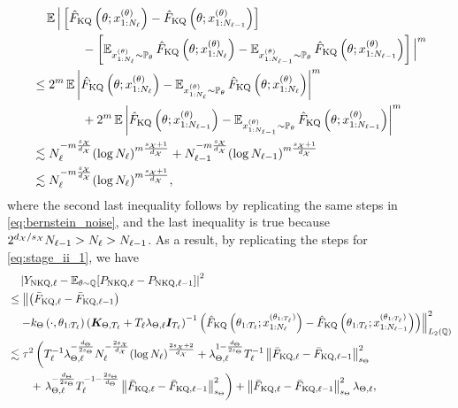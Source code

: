 \begin{align*}
    &\quad \operatorname{\mathbb{E}} \Big| \left[ \hat{F}_{\text{KQ}} \left(\theta; x_{1:N_\ell}^{(\theta)} \right) -  \hat{F}_{\text{KQ}}\left(\theta; x_{1:N_{\ell - 1} }^{ (\theta) } \right) \right] \\
    &\qquad\qquad - \left[ \operatorname{\mathbb{E}}_{x_{1:N_\ell}^{(\theta)} \sim \mathbb{P}_{\theta} } \hat{F}_{\text{KQ}} \left( \theta; x_{1:N_\ell}^{(\theta)} \right) - \operatorname{\mathbb{E}}_{x_{1:N_{ \ell - 1} }^{(\theta)} \sim \mathbb{P}_{\theta} } \hat{F}_{\text{KQ}} \left( \theta; x_{1:N_{\ell-1} }^{(\theta)} \right) \right] \Big|^m \\
    &\leq 2^m \operatorname{\mathbb{E}} \left| \hat{F}_{\text{KQ}} \left(\theta; x_{1:N_\ell}^{(\theta)} \right) 
    -  \operatorname{\mathbb{E}}_{x_{1:N_\ell}^{(\theta)} \sim \mathbb{P}_{\theta} } \hat{F}_{\text{KQ}} \left( \theta; x_{1:N_\ell}^{(\theta)} \right) \right|^m 
    \\
    &\qquad\qquad + 2^m \operatorname{\mathbb{E}} \left| \hat{F}_{\text{KQ}}\left(\theta; x_{1:N_{\ell - 1} }^{ (\theta) } \right) - \operatorname{\mathbb{E}}_{x_{1:N_{ \ell - 1} }^{(\theta)} \sim \mathbb{P}_{\theta} } \hat{F}_{\text{KQ}} \left( \theta; x_{1:N_{\ell-1} }^{(\theta)} \right) \right|^m \\
    &\lesssim N_\ell^{-m \frac{s_{\mathcal{X}}}{d_{\mathcal{X}}}} (\log N_\ell)^{m\frac{s_{\mathcal{X}}+1}{d_{\mathcal{X}}}} + N_{\ell-1}^{-m \frac{s_{\mathcal{X}}}{d_{\mathcal{X}}}} (\log N_{\ell-1})^{m\frac{s_{\mathcal{X}}+1}{d_{\mathcal{X}}}} \\
    &\lesssim N_\ell^{-m \frac{s_{\mathcal{X}}}{d_{\mathcal{X}}}} (\log N_\ell)^{m\frac{s_{\mathcal{X}}+1}{d_{\mathcal{X}}}},
\end{align*}
where the second last inequality follows by replicating the same steps in \eqref{eq:bernstein_noise}, and the last inequality is true because $2^{ d_{\mathcal{X}} / s_{\mathcal{X}}} N_{\ell-1} > N_\ell > N_{\ell - 1}$. 
As a result, by replicating the steps for \eqref{eq:stage_ii_1}, we have
\begin{align}\label{eq:Y_l_P_l}
    &\quad \left| Y_{\text{NKQ}, \ell} - \operatorname{\mathbb{E}}_{\theta \sim \mathbb{Q}}[P_{\text{NKQ}, \ell} - P_{\text{NKQ}, \ell-1}] \right|^2 \nonumber \\
    &\leq \left\| \left( \bar{F}_{\text{KQ}, \ell} - \bar{F}_{\text{KQ}, \ell-1} \right) \right. \nonumber \\
    &\quad \left. - k_{\Theta}\left(\cdot, \theta_{1: T_\ell} \right) \left(\boldsymbol{K}_{\Theta, T_\ell} + T_\ell \lambda_{\Theta, \ell} \boldsymbol{I}_{T_\ell} \right)^{-1} \left( \hat{F}_{\text{KQ}}\left(\theta_{1: T_\ell}; x_{1:N_\ell}^{(\theta_{1:T_\ell} )} \right) - \hat{F}_{\text{KQ}}\left(\theta_{1: T_\ell}; x_{1:N_{\ell - 1} }^{ (\theta_{1:T_\ell}) } \right) \right) \right\|_{L_2(\mathbb{Q})}^2 \nonumber \\
    & \lesssim \tau^2 \left( T_\ell^{-1} \lambda_{\Theta, \ell}^{ -\frac{d_\Theta}{2s_\Theta} } N_\ell^{-\frac{2s_{\mathcal{X}}}{d_{\mathcal{X}}}} (\log N_\ell)^{\frac{2s_{\mathcal{X}}+2}{d_{\mathcal{X}}}} + \lambda_{\Theta, \ell}^{1 - \frac{d_\Theta}{2s_\Theta}} T_\ell^{-1} \left\|\bar{F}_{\text{KQ}, \ell} - \bar{F}_{\text{KQ}, \ell-1} \right\|_{s_{\Theta}}^2 \right. \nonumber \\
    &\qquad + \left. \lambda_{\Theta, \ell}^{-\frac{d_\Theta}{2s_\Theta}} T_\ell^{-1 - \frac{2s_\Theta}{d_\Theta}}  \left\|\bar{F}_{\text{KQ}, \ell} - \bar{F}_{\text{KQ}, \ell-1} \right\|_{s_{\Theta}}^2 \right) + \left\| \bar{F}_{\text{KQ}, \ell} - \bar{F}_{\text{KQ}, \ell-1} \right\|_{s_{\Theta}}^2 \lambda_{\Theta, \ell} , 
\end{align}
